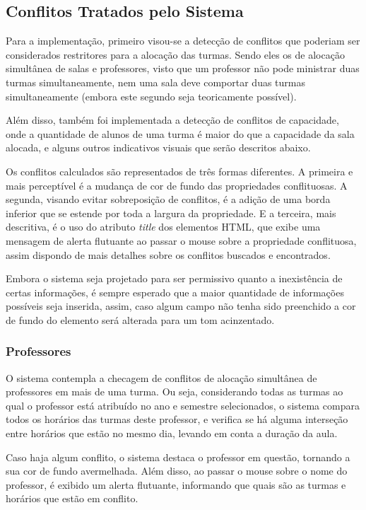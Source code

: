 \subsection{Conflitos Tratados pelo Sistema}

Para a implementação, primeiro visou-se a detecção de conflitos que poderiam ser considerados restritores para a alocação das turmas. Sendo eles os de alocação simultânea de salas e professores, visto que um professor não pode ministrar duas turmas simultaneamente, nem uma sala deve comportar duas turmas simultaneamente (embora este segundo seja teoricamente possível).

Além disso, também foi implementada a detecção de conflitos de capacidade, onde a quantidade de alunos de uma turma é maior do que a capacidade da sala alocada, e alguns outros indicativos visuais que serão descritos abaixo.

Os conflitos calculados são representados de três formas diferentes. A primeira e mais perceptível é a mudança de cor de fundo das propriedades conflituosas. A segunda, visando evitar sobreposição de conflitos, é a adição de uma borda inferior que se estende por toda a largura da propriedade. E a terceira, mais descritiva, é o uso do atributo \textit{title} dos elementos HTML, que exibe uma mensagem de alerta flutuante ao passar o mouse sobre a propriedade conflituosa, assim dispondo de mais detalhes sobre os conflitos buscados e encontrados.

Embora o sistema seja projetado para ser permissivo quanto a inexistência de certas informações, é sempre esperado que a maior quantidade de informações possíveis seja inserida, assim, caso algum campo não tenha sido preenchido a cor de fundo do elemento será alterada para um tom acinzentado.


\subsubsection{Professores}

O sistema contempla a checagem de conflitos de alocação simultânea de professores em mais de uma turma. Ou seja, considerando todas as turmas ao qual o professor está atribuído no ano e semestre selecionados, o sistema compara todos os horários das turmas deste professor, e verifica se há alguma interseção entre horários que estão no mesmo dia, levando em conta a duração da aula.

Caso haja algum conflito, o sistema destaca o professor em questão, tornando a sua cor de fundo avermelhada. Além disso, ao passar o mouse sobre o nome do professor, é exibido um alerta flutuante, informando que quais são as turmas e horários que estão em conflito.

